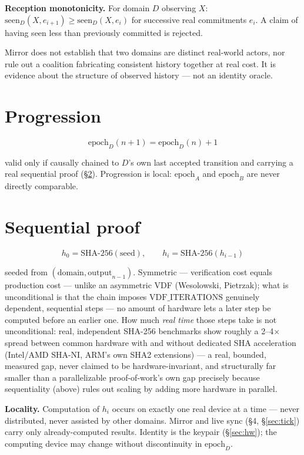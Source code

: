 \documentclass[10pt]{article}
\begin{document}
\textbf{Reception monotonicity.} For domain $D$ observing $X$: $\mathrm{seen}_D(X, e_{i+1}) \geq \mathrm{seen}_D(X, e_i)$ for successive real commitments $e_i$. A claim of having seen less than previously committed is rejected.

Mirror does not establish that two domains are distinct real-world actors, nor rule out a coalition fabricating consistent history together at real cost. It is evidence about the structure of observed history --- not an identity oracle.

\section{Progression}
\label{sec:progression}

\[
\mathrm{epoch}_D(n+1) = \mathrm{epoch}_D(n) + 1
\]

valid only if causally chained to $D$'s own last accepted transition and carrying a real sequential proof (\S\ref{sec:seq}). Progression is local: $\mathrm{epoch}_A$ and $\mathrm{epoch}_B$ are never directly comparable.

\section{Sequential proof}
\label{sec:seq}

\[
h_0 = \mathrm{SHA\text{-}256}(\mathrm{seed}), \qquad h_i = \mathrm{SHA\text{-}256}(h_{i-1})
\]

seeded from $(\mathrm{domain}, \mathrm{output}_{n-1})$. Symmetric --- verification cost equals production cost --- unlike an asymmetric VDF (Wesolowski, Pietrzak); what is unconditional is that the chain imposes $\mathrm{VDF\_ITERATIONS}$ genuinely dependent, sequential steps --- no amount of hardware lets a later step be computed before an earlier one. How much \emph{real time} those steps take is not unconditional: real, independent SHA-256 benchmarks show roughly a 2--4$\times$ spread between common hardware with and without dedicated SHA acceleration (Intel/AMD SHA-NI, ARM's own SHA2 extensions) --- a real, bounded, measured gap, never claimed to be hardware-invariant, and structurally far smaller than a parallelizable proof-of-work's own gap precisely because sequentiality (above) rules out scaling by adding more hardware in parallel.

\textbf{Locality.} Computation of $h_i$ occurs on exactly one real device at a time --- never distributed, never assisted by other domains. Mirror and live sync (\S4, \S\ref{sec:tick}) carry only already-computed results. Identity is the keypair (\S\ref{sec:hw}); the computing device may change without discontinuity in $\mathrm{epoch}_D$.
\end{document}
